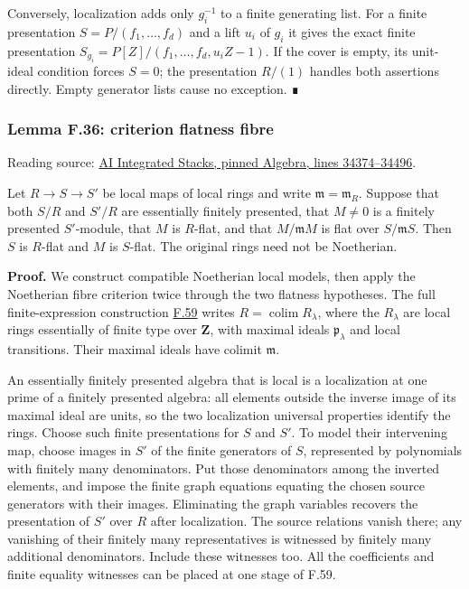 \documentclass[11pt,a4paper,openany]{report}
\begin{document}
Conversely, localization adds only \(g_i^{-1}\) to a finite generating list. For a finite presentation \(S=P/(f_1,\ldots,f_d)\) and a lift \(u_i\) of \(g_i\) it gives the exact finite presentation \(S_{g_i}=P[Z]/(f_1,\ldots,f_d,u_iZ-1)\). If the cover is empty, its unit-ideal condition forces \(S=0\); the presentation \(R/(1)\) handles both assertions directly. Empty generator lists cause no exception. ∎

\label{AG-RG-S05-algebra-lemma-criterion-flatness-fibre}

\subsubsection{Lemma F.36: criterion flatness fibre}\label{AG-RG-S05-lemma-f.36-criterion-flatness-fibre}

Reading source: \href{https://github.com/KokunoYumeto/unofficial-stacks-project-ai-drafts/blob/565b10e987aba5969b21145a0833f42d69f96790/algebra.tex\#L34374-L34496}{AI Integrated Stacks, pinned Algebra, lines 34374--34496}.

Let \(R\to S\to S'\) be local maps of local rings and write \(\mathfrak m=\mathfrak m_R\). Suppose that both \(S/R\) and \(S'/R\) are essentially finitely presented, that \(M\ne0\) is a finitely presented \(S'\)-module, that \(M\) is \(R\)-flat, and that \(M/\mathfrak mM\) is flat over \(S/\mathfrak mS\). Then \(S\) is \(R\)-flat and \(M\) is \(S\)-flat. The original rings need not be Noetherian.

\textbf{Proof.} We construct compatible Noetherian local models, then apply the Noetherian fibre criterion twice through the two flatness hypotheses. The full finite-expression construction \hyperref[AG-RG-S05-algebra-lemma-limit-essentially-finite-presentation]{F.59} writes \(R=\operatorname*{colim}R_\lambda\), where the \(R_\lambda\) are local rings essentially of finite type over \(\mathbf Z\), with maximal ideals \(\mathfrak p_\lambda\) and local transitions. Their maximal ideals have colimit \(\mathfrak m\).

An essentially finitely presented algebra that is local is a localization at one prime of a finitely presented algebra: all elements outside the inverse image of its maximal ideal are units, so the two localization universal properties identify the rings. Choose such finite presentations for \(S\) and \(S'\). To model their intervening map, choose images in \(S'\) of the finite generators of \(S\), represented by polynomials with finitely many denominators. Put those denominators among the inverted elements, and impose the finite graph equations equating the chosen source generators with their images. Eliminating the graph variables recovers the presentation of \(S'\) over \(R\) after localization. The source relations vanish there; any vanishing of their finitely many representatives is witnessed by finitely many additional denominators. Include these witnesses too. All the coefficients and finite equality witnesses can be placed at one stage of F.59.
\end{document}
